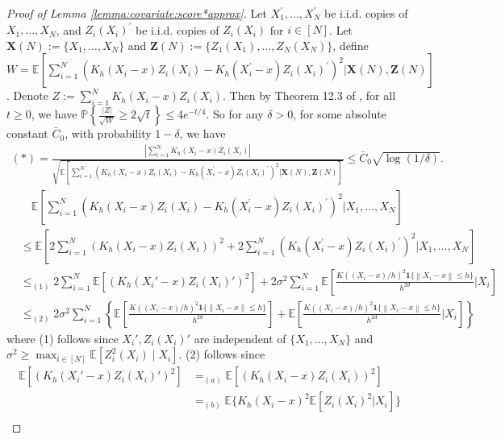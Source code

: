 \documentclass[11pt]{article}
\newcommand{\norm}[1]{\left\lVert #1 \right\rVert}
\begin{document}
\begin{proof}[Proof of Lemma \ref{lemma:covariate:score*approx}]
Let $X_1^\prime,\ldots,X_N^\prime$ be i.i.d. copies of $X_1,\ldots,X_N$, and $Z_i(X_i)^\prime$ be i.i.d. copies of $Z_i(X_i)$ for $i\in[N]$. Let $\mathbf{X}(N):=\{X_1,\ldots,X_N\}$ and $\mathbf{Z}(N):=\{Z_1(X_1),\ldots,Z_N(X_N)\}$, define $\displaystyle W = \mathbb{E}\left[\sum_{i=1}^N\left(K_h(X_i-x)Z_i(X_i)-K_h(X_i^\prime-x)Z_i(X_i)^\prime\right)^2\big| \mathbf{X}(N),\mathbf{Z}(N)\right]$.
Denote $Z:=\sum_{i=1}^NK_h(X_i-x)Z_i(X_i)$. 
Then by Theorem 12.3 of \citet{boucheron2003concentration}, for all $t\geq0$, we have $\displaystyle\mathbb{P}\left\{\frac{|Z|}{\sqrt{W}}\geq2\sqrt{t}\right\}\leq4e^{-t/4}$. So for any $\delta>0$, for some absolute constant $\bar{C}_0$, with probability $1-\delta$, we have 
$$\begin{array}{rl}
(*)=\displaystyle\frac{\left|\sum_{i=1}^N K_h(X_i-x) Z_i(X_i) \right|}{\sqrt{\mathbb{E}\left[\sum_{i=1}^N\left(K_h(X_i-x)Z_i(X_i)-K_h(X_i^\prime-x)Z_i(X_i)^\prime\right)^2\big| \mathbf{X}(N),\mathbf{Z}(N)\right]}}\leq \bar{C}_0\sqrt{\log(1/\delta)}.
\end{array}$$
$$\begin{array}{rl}
&\displaystyle\quad\mathbb{E}\left[\sum_{i=1}^N\left(K_h(X_i-x)Z_i(X_i)-K_h(X_i^\prime-x)Z_i(X_i)^\prime\right)^2\big| X_1,\ldots,X_N\right]\\
&\displaystyle\leq\mathbb{E}\left[2\sum_{i=1}^N\left(K_h(X_i-x)Z_i(X_i)\right)^2+2\sum_{i=1}^N\left(K_h(X_i^\prime-x)Z_i(X_i)^\prime\right)^2\big| X_1,\ldots,X_N\right]\\
&\displaystyle\leq_{(1)}2\sum_{i=1}^N\mathbb{E}\left[\left(K_h(X_i'-x)Z_i(X_i)'\right)^2\right]+2\sigma^2\sum_{i=1}^N\mathbb{E}\left[\frac{K((X_i-x)/h)^2\mathbf{1}\{\norm{X_i-x}\leq h\}}{h^{2d}}\big|X_i\right]\\
&\displaystyle\leq_{(2)}2\sigma^2\sum_{i=1}^N\left\{\mathbb{E}\left[\frac{K((X_i-x)/h)^2\mathbf{1}\{\|X_i-x\|\leq h\}}{h^{2d}}\right]+\mathbb{E}\left[\frac{K((X_i-x)/h)^2\mathbf{1}\{\norm{X_i-x}\leq h\}}{h^{2d}}\big|X_i\right]\right\}
\end{array}$$
where (1) follows since $X_i', Z_i(X_i)'$ are independent of $\{X_1,\ldots,X_N\}$ and $\sigma^2 \geq \max_{i\in[N]}\mathbb{E}[Z_i^2(X_i) \mid X_i]$. (2) follows since 
$$\begin{array}{rl}
\mathbb{E}\left[\left(K_h(X_i'-x)Z_i(X_i)'\right)^2\right]&\displaystyle=_{(a)}\mathbb{E}\left[\left(K_h(X_i-x)Z_i(X_i)\right)^2\right]\\
&\displaystyle=_{(b)}\mathbb{E}\{K_h(X_i-x)^2\mathbb{E}\left[Z_i(X_i)^2|X_i\right]\}\\

\end{array}$$
\end{proof}
\end{document}

